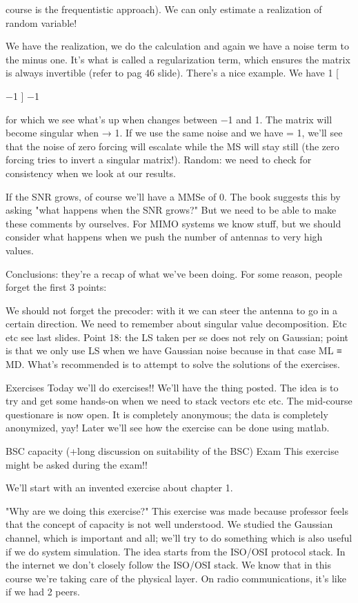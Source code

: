 {{{course is the frequentistic approach).
We can only estimate a realization of random variable!

We have the realization, we do the calculation and again we have a noise term to the minus one. It's what is called a regularization term, which ensures the matrix is always invertible (refer to pag 46 slide).
There's a nice example.
We have 1
[
\rho

−1
]
−1

for which we see what's up when \rho changes between −1 and 1. The matrix will become singular when \rho → 1. If we use the same noise and we have \rho = 1, we'll see that the noise of zero forcing will escalate while the MS will stay still (the zero forcing tries to invert a singular matrix!).
Random: we need to check for consistency when we look at our results.

If the SNR grows, of course we'll have a MMSe of 0.
The book suggests this by asking "what happens when the SNR grows?" But we need to be able to make these comments by ourselves.
For MIMO systems we know stuff, but we should consider what happens when we push the number of antennas to very high values.

Conclusions: they're a recap of what we've been doing.
For some reason, people forget the first 3 points:

We should not forget the precoder: with it we can steer the antenna to go in a certain direction.
We need to remember about singular value decomposition.
Etc etc see last slides.
Point 18: the LS taken per se does not rely on Gaussian; point is that we only use LS when we have Gaussian noise because in that case ML ≡ MD.
What's recommended is to attempt to solve the solutions of the exercises.

Exercises Today we'll do exercises!!
We'll have the thing posted.
The idea is to try and get some hands-on when we need to stack vectors etc etc.
The mid-course questionare is now open. It is completely anonymous; the data is completely anonymized, yay!
Later we'll see how the exercise can be done using matlab.

BSC capacity (+long discussion on suitability of the BSC)
Exam This exercise might be asked during the exam!!

We'll start with an invented exercise about chapter 1.

"Why are we doing this exercise?"
This exercise was made because professor feels that the concept of capacity is not well understood. We studied the Gaussian channel, which is important and all; we'll try to do something which is also useful if we do system simulation.
The idea starts from the ISO/OSI protocol stack. In the internet we don't closely follow the ISO/OSI stack. We know that in this course we're taking care of the physical layer.
On radio communications, it's like if we had 2 peers.

}}}
